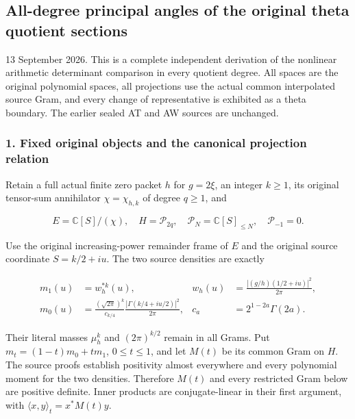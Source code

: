 \subsection{All-degree principal angles of the original theta quotient sections}\label{endpoint-all_degree_angle_review--all-degree-principal-angles-of-the-original-theta-quotient-sections}

13 September 2026. This is a complete independent derivation of the nonlinear arithmetic determinant comparison in every quotient degree. All spaces are the original polynomial spaces, all projections use the actual common interpolated source Gram, and every change of representative is exhibited as a theta boundary. The earlier sealed AT and AW sources are unchanged.

\subsubsection{1. Fixed original objects and the canonical projection relation}\label{endpoint-all_degree_angle_review--fixed-original-objects-and-the-canonical-projection-relation}

Retain a full actual finite zero packet \(h\) for \(g=2\xi\), an integer \(k\ge1\), its original tensor-sum annihilator \(\chi=\chi_{h,k}\) of degree \(q\ge1\), and

\[
E=\mathbb C[S]/(\chi),\quad H=\mathcal P_{2q},\quad
\mathcal P_N=\mathbb C[S]_{\le N},\quad\mathcal P_{-1}=0.
\tag{AA1}
\]

Use the original increasing-power remainder frame of \(E\) and the original source coordinate \(S=k/2+iu\). The two source densities are exactly

\[
\begin{aligned}
m_1(u)&=w_h^{*k}(u),&w_h(u)&=\frac{|(g/h)(1/2+iu)|^2}{2\pi},\\
m_0(u)&=\frac{(\sqrt{2\pi})^k}{c_{k/4}}
 \frac{|\Gamma(k/4+iu/2)|^2}{2\pi},&c_a&=2^{1-2a}\Gamma(2a).
\end{aligned}
\tag{AA2}
\]

Their literal masses \(\mu_h^k\) and \((2\pi)^{k/2}\) remain in all Grams. Put \(m_t=(1-t)m_0+tm_1\), \(0\le t\le1\), and let \(M(t)\) be its common Gram on \(H\). The source proofs establish positivity almost everywhere and every polynomial moment for the two densities. Therefore \(M(t)\) and every restricted Gram below are positive definite. Inner products are conjugate-linear in their first argument, with \(\langle x,y\rangle_t=x^*M(t)y\).

